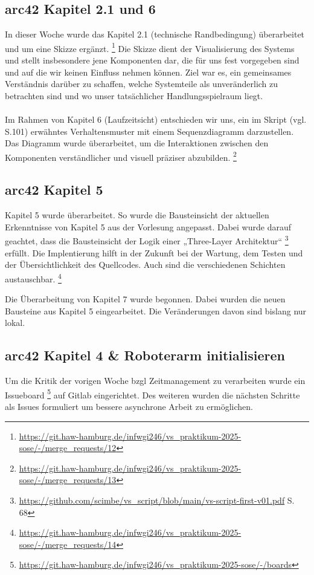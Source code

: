 \documentclass{article}
\begin{document}
\subsection{arc42 Kapitel 2.1 und 6}
In dieser Woche wurde das Kapitel 2.1 (technische Randbedingung) überarbeitet und um eine Skizze ergänzt.
 \footnote{\url {https://git.haw-hamburg.de/infwgi246/vs_praktikum-2025-sose/-/merge_requests/12}}
Die Skizze dient der Visualisierung des Systems und stellt insbesondere jene Komponenten dar, die für uns fest vorgegeben sind und auf die wir keinen Einfluss nehmen können.
Ziel war es, ein gemeinsames Verständnis darüber zu schaffen, welche Systemteile als unveränderlich zu betrachten sind und wo unser tatsächlicher Handlungsspielraum liegt.
\\\\
Im Rahmen von Kapitel 6 (Laufzeitsicht) entschieden wir uns, ein im Skript (vgl. S.101) erwähntes Verhaltensmuster mit einem Sequenzdiagramm darzustellen.
Das Diagramm wurde überarbeitet, um die Interaktionen zwischen den Komponenten verständlicher und visuell präziser abzubilden.
\footnote{\url {https://git.haw-hamburg.de/infwgi246/vs_praktikum-2025-sose/-/merge_requests/13}}




\subsection{arc42 Kapitel 5}
Kapitel 5 wurde überarbeitet.
So wurde die Bausteinsicht der aktuellen Erkenntnisse von Kapitel 5 aus der Vorlesung angepasst. 
Dabei wurde darauf geachtet, dass die Bausteinsicht der Logik einer „Three-Layer Architektur“ \footnote{\url{https://github.com/scimbe/vs_script/blob/main/vs-script-first-v01.pdf} S. 68 } erfüllt.
Die Implentierung hilft in der Zukunft bei der Wartung, dem Testen und der Übersichtlichkeit des Quellcodes. Auch sind die verschiedenen Schichten austauschbar.
\footnote{\url{https://git.haw-hamburg.de/infwgi246/vs_praktikum-2025-sose/-/merge_requests/14}}

Die Überarbeitung von Kapitel 7 wurde begonnen. Dabei wurden die neuen Bausteine aus Kapitel 5 eingearbeitet. Die Veränderungen davon sind bislang nur lokal.
\subsection{arc42 Kapitel 4 \& Roboterarm initialisieren} 
Um die Kritik der vorigen Woche bzgl Zeitmanagement zu verarbeiten wurde ein Issueboard
\footnote{\url{https://git.haw-hamburg.de/infwgi246/vs_praktikum-2025-sose/-/boards}}
auf Gitlab eingerichtet. Des weiteren wurden die nächsten Schritte als Issues formuliert 
um bessere asynchrone Arbeit zu ermöglichen. 
\end{document}
